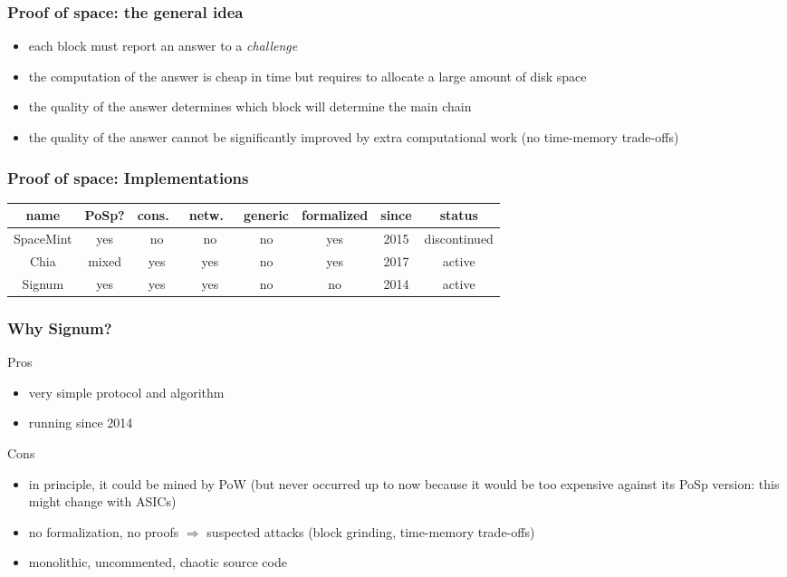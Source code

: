 \documentclass[11pt]{beamer}  %
\begin{document}
\begin{frame}\frametitle{Proof of space: the general idea}

  \begin{itemize}
  \item each block must report an answer to a \emph{challenge}
  \item the computation of the answer is cheap in time but requires to allocate a large amount of disk space
  \item the quality of the answer determines which block will determine the main chain
  \item the quality of the answer cannot be significantly improved by extra computational work (no time-memory trade-offs)
  \end{itemize}
  
\end{frame}

\begin{frame}\frametitle{Proof of space: Implementations}

  \begin{center}
    {\small\begin{tabular}{c|c|c|c|c|c|c|c}
      name & PoSp? & cons.\ & netw.\ & generic & formalized & since & status \\\hline\hline
      SpaceMint & yes & no & no & no & yes & 2015 & discontinued\\\hline
      Chia & mixed & yes & yes & no & yes & 2017 & active\\\hline
      Signum & yes & yes & yes & no & no & 2014 & active\\\hline
    \end{tabular}}
  \end{center}
  
\end{frame}

\begin{frame}\frametitle{Why Signum?}

  \begin{greenbox}{Pros}
    \begin{itemize}
    \item very simple protocol and algorithm
    \item running since 2014
    \end{itemize}
  \end{greenbox}

  \bigskip

  \begin{greenbox}{Cons}
    \begin{itemize}
    \item in principle, it could be mined by PoW (but never occurred up to now because it would be too expensive
      against its PoSp version: this might change with ASICs)
    \item no formalization, no proofs $\Rightarrow$ suspected attacks (block grinding, time-memory trade-offs)
    \item monolithic, uncommented, chaotic source code
    \end{itemize}
  \end{greenbox}
    
\end{frame}
\end{document}
